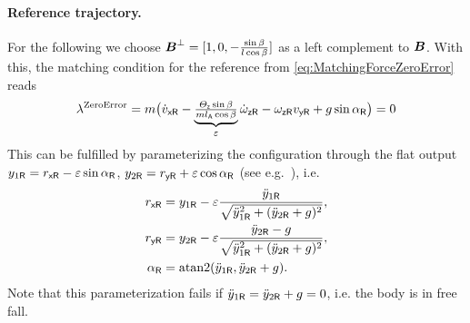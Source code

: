 
\paragraph{Reference trajectory.}
For the following we choose $\boldsymbol{B}^\bot = [1, 0, -\tfrac{\sin\beta}{l \cos\beta}]$ as a left complement to $\boldsymbol{B}$.
With this, the matching condition for the reference from \eqref{eq:MatchingForceZeroError} reads
\begin{align}
 \lambda^{\text{ZeroError}} = m \big(\dot{v}_{\mathsf{x}\mathsf{R}} - \underbrace{\tfrac{\varTheta_{\mathsf{z}} \sin\beta}{m l_{\mathsf{A}} \cos\beta}}_{\varepsilon} \dot{\omega}_{\mathsf{z}\mathsf{R}} - \omega_{\mathsf{z}\mathsf{R}} v_{\mathsf{y}\mathsf{R}} + g \sin\alpha_{\mathsf{R}} \big) = 0
\end{align}
This can be fulfilled by parameterizing the configuration through the flat output $y_{1\mathsf{R}} = r_{\mathsf{x}\mathsf{R}} - \varepsilon \sin\alpha_{\mathsf{R}}$, $y_{2\mathsf{R}} = r_{\mathsf{y}\mathsf{R}} + \varepsilon \cos\alpha_{\mathsf{R}}$ (see e.g.\ \cite{Fliess:LieBacklund}), i.e.
\begin{align}
 r_{\mathsf{x}\mathsf{R}} &= y_{1\mathsf{R}} - \varepsilon \frac{\ddot{y}_{1\mathsf{R}}}{\sqrt{\ddot{y}_{1\mathsf{R}}^2 + (\ddot{y}_{2\mathsf{R}}+g)^2}},
\\
 r_{\mathsf{y}\mathsf{R}} &= y_{2\mathsf{R}} - \varepsilon \frac{\ddot{y}_{2\mathsf{R}}-g}{\sqrt{\ddot{y}_{1\mathsf{R}}^2 + (\ddot{y}_{2\mathsf{R}}+g)^2}},
\\
 \alpha_{\mathsf{R}} &= \operatorname{atan2}(\ddot{y}_{1\mathsf{R}}, \ddot{y}_{2\mathsf{R}}+g).
\end{align}
Note that this parameterization fails if $\ddot{y}_{1\mathsf{R}} = \ddot{y}_{2\mathsf{R}}+g = 0$, i.e. the body is in free fall.

